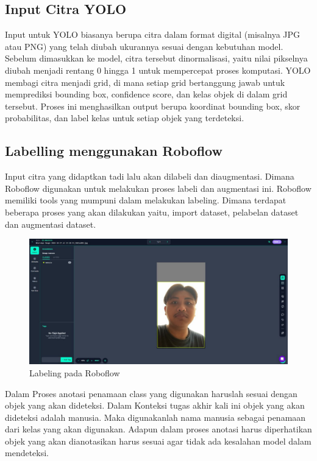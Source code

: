 \subsection{Input Citra YOLO}
Input untuk YOLO biasanya berupa citra dalam format digital (misalnya JPG atau PNG) yang telah diubah ukurannya sesuai dengan kebutuhan model. Sebelum dimasukkan ke model, citra tersebut dinormalisasi, yaitu nilai pikselnya diubah menjadi rentang 0 hingga 1 untuk mempercepat proses komputasi. YOLO membagi citra menjadi grid, di mana setiap grid bertanggung jawab untuk memprediksi bounding box, confidence score, dan kelas objek di dalam grid tersebut. Proses ini menghasilkan output berupa koordinat bounding box, skor probabilitas, dan label kelas untuk setiap objek yang terdeteksi.

\subsection{Labelling menggunakan Roboflow}
Input citra yang didaptkan tadi lalu akan dilabeli dan diaugmentasi. Dimana Roboflow digunakan untuk melakukan proses labeli dan augmentasi ini. Roboflow memiliki tools yang mumpuni dalam melakukan labeling. Dimana terdapat beberapa proses yang akan dilakukan yaitu, import dataset, pelabelan dataset dan augmentasi dataset.

\begin{figure} [H] \centering
  \includegraphics[scale=0.2]{gambar/devafoto.jpeg}
  \caption{Labeling pada Roboflow}
  \label{fig:rancangan penelitian}
\end{figure}

Dalam Proses anotasi penamaan class yang digunakan haruslah sesuai dengan objek yang akan dideteksi. Dalam Konteksi tugas akhir kali ini objek yang akan dideteksi adalah manusia. Maka digunakanlah nama manusia sebagai penamaan dari kelas yang akan digunakan. Adapun dalam proses anotasi harus diperhatikan objek yang akan dianotasikan harus sesuai agar tidak ada kesalahan model dalam mendeteksi. %

